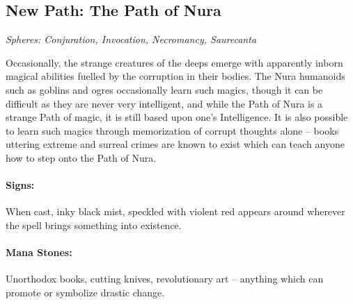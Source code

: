 \begin{multicols}{2}

\subsection{New Path: The Path of Nura}

\textit{Spheres: Conjuration, Invocation, Necromancy, Saurecanta}

\noindent Occasionally, the strange creatures of the deeps emerge with apparently inborn magical abilities fuelled by the corruption in their bodies.
The Nura humanoids such as goblins and ogres occasionally learn such magics, though it can be difficult as they are never very intelligent, and while the Path of Nura is a strange Path of magic, it is still based upon one's Intelligence.
It is also possible to learn such magics through memorization of corrupt thoughts alone -- books uttering extreme and surreal crimes are known to exist which can teach anyone how to step onto the Path of Nura.

\paragraph{Signs:} When cast, inky black mist, speckled with violent red appears around wherever the spell brings something into existence.

\paragraph{Mana Stones:} Unorthodox books, cutting knives, revolutionary art -- anything which can promote or symbolize drastic change.

\end{multicols}


